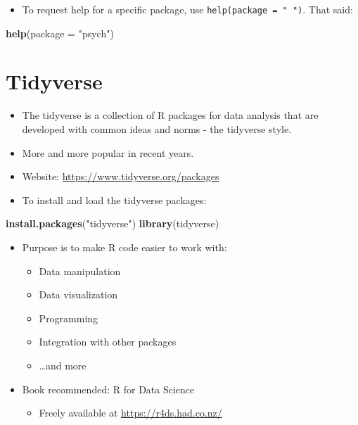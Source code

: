\documentclass[
]{book}
\newenvironment{Shaded}{\begin{snugshade}}{\end{snugshade}}
\newcommand{\AttributeTok}[1]{\textcolor[rgb]{0.13,0.29,0.53}{#1}}
\newcommand{\FunctionTok}[1]{\textcolor[rgb]{0.13,0.29,0.53}{\textbf{#1}}}
\newcommand{\NormalTok}[1]{#1}
\newcommand{\StringTok}[1]{\textcolor[rgb]{0.31,0.60,0.02}{#1}}
\providecommand{\tightlist}{%
  \setlength{\itemsep}{0pt}\setlength{\parskip}{0pt}}
\begin{document}
\begin{itemize}
\tightlist
\item
  To request help for a specific package, use \texttt{help(package\ =\ "\ ")}. That said:
\end{itemize}

\begin{Shaded}
\begin{Highlighting}[]
\FunctionTok{help}\NormalTok{(}\AttributeTok{package =} \StringTok{"psych"}\NormalTok{)}
\end{Highlighting}
\end{Shaded}

\section{Tidyverse}\label{tidyverse}

\begin{itemize}
\tightlist
\item
  The tidyverse is a collection of R packages for data analysis that are developed with common ideas and norms - the tidyverse style.
\item
  More and more popular in recent years.
\item
  Website: \url{https://www.tidyverse.org/packages}
\item
  To install and load the tidyverse packages:
\end{itemize}

\begin{Shaded}
\begin{Highlighting}[]
\FunctionTok{install.packages}\NormalTok{(}\StringTok{"tidyverse"}\NormalTok{)}
\FunctionTok{library}\NormalTok{(tidyverse)}
\end{Highlighting}
\end{Shaded}

\begin{itemize}
\item
  Purpose is to make R code easier to work with:

  \begin{itemize}
  \tightlist
  \item
    Data manipulation
  \item
    Data visualization
  \item
    Programming
  \item
    Integration with other packages
  \item
    \ldots and more
  \end{itemize}
\item
  Book recommended: R for Data Science

  \begin{itemize}
  \tightlist
  \item
    Freely available at \url{https://r4ds.had.co.nz/}
  \end{itemize}
\end{itemize}
\end{document}
